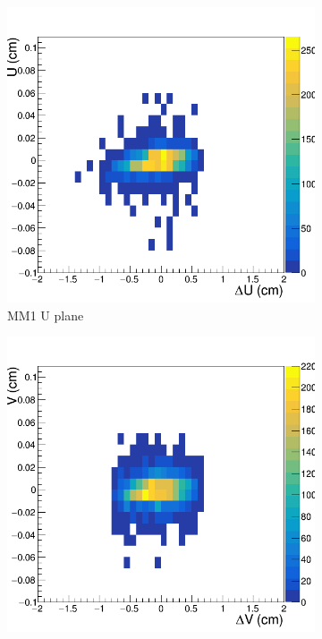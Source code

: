 \begin{figure}[h!]
\centering
 \begin{subfigure}[l]{.45\textwidth}
   \centering
   \includegraphics[width=\linewidth]{thesis_figures/alignment/Run_3211_T/rotMX1U_after_millepede_T.png}
   \caption{MM1 U plane}
 \end{subfigure}
 \begin{subfigure}[r]{.45\textwidth}
   \centering
   \includegraphics[width=\linewidth]{thesis_figures/alignment/Run_3211_T/rotMX1V_after_millepede_T.png}

\end{subfigure}
\end{figure}
